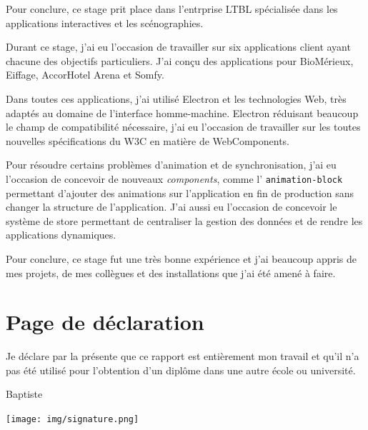 \documentclass{article}
\newcommand{\components}{\emph{components}\xspace}
\newcommand{\aha}{AccorHotel Arena\xspace}
\begin{document}
    Pour conclure, ce stage prit place dans l'entrprise LTBL spécialisée dans les applications interactives et les scénographies.

    Durant ce stage, j'ai eu l'occasion de travailler sur six applications client ayant chacune des objectifs particuliers.
    J'ai conçu des applications pour BioMérieux, Eiffage, \aha et Somfy.

    Dans toutes ces applications, j'ai utilisé Electron et les technologies Web, très adaptés au domaine de l'interface homme-machine.
    Electron réduisant beaucoup le champ de compatibilité nécessaire, j'ai eu l'occasion de travailler sur les toutes nouvelles spécifications du W3C en matière de WebComponents.

    Pour résoudre certains problèmes d'animation et de synchronisation, j'ai eu l'occasion de concevoir de nouveaux \components, comme l’ \texttt{animation-block} permettant d'ajouter des animations sur l'application en fin de production sans changer la structure de l'application.
    J'ai aussi eu l'occasion de concevoir le système de store permettant de centraliser la gestion des données et de rendre les applications dynamiques.

    Pour conclure, ce stage fut une très bonne expérience et j'ai beaucoup appris de mes projets, de mes collègues et des installations que j'ai été amené à faire.

    \clearpage

    \section{Page de déclaration}

    \vspace{\fill}

    Je déclare par la présente que ce rapport est entièrement mon travail et qu'il n'a pas été utilisé pour l'obtention d'un diplôme dans une autre école ou université.

    \vspace{3cm}

    \hspace{\fill}Baptiste 

    \hspace{\fill}\texttt{[image: img/signature.png]}

    \vspace{\fill}
\end{document}
